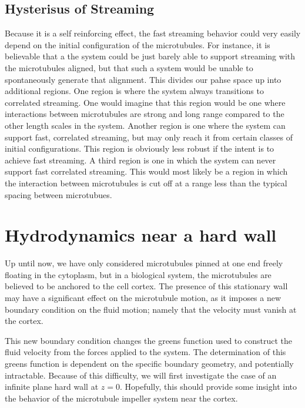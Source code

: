 \documentclass[11pt]{ucthesis}
\begin{document}
\subsection{Hysterisus of Streaming}
Because it is a self reinforcing effect, the fast streaming behavior could very easily depend on the initial configuration of the microtubules. 
For instance, it is believable that a the system could be just barely able to support streaming with the microtubules aligned, but that such a system would be unable to spontaneously generate that alignment.
This divides our pahse space up into additional regions.
One region is where the system always transitions to correlated streaming. One would imagine that this region would be one where interactions between microtubules are strong and long range compared to the other length scales in the system.
Another region is one where the system can support fast, correlated streaming, but may only reach it from certain classes of initial configurations. This region is obviously less robust if the intent is to achieve fast streaming.
A third region is one in which the system can never support fast correlated streaming. This would most likely be a region in which the interaction between microtubules is cut off at a range less than the typical spacing between microtubues.

\section{Hydrodynamics near a hard wall}
Up until now, we have only considered microtubules pinned at one end freely floating in the cytoplasm, but in a biological system, the microtubules are believed to be anchored to the cell cortex. 
The presence of this stationary wall may have a significant effect on the microtubule motion, as it imposes a new boundary condition on the fluid motion; namely that the velocity must vanish at the cortex.


This new boundary condition changes the greens function used to construct the fluid velocity from the forces applied to the system. The determination of this greens function is dependent on the specific boundary geometry, and potentially intractable.
Because of this difficulty, we will first investigate the case of an infinite plane hard wall at $z=0$. Hopefully, this should provide some insight into the behavior of the microtubule impeller system near the cortex.
\end{document}

